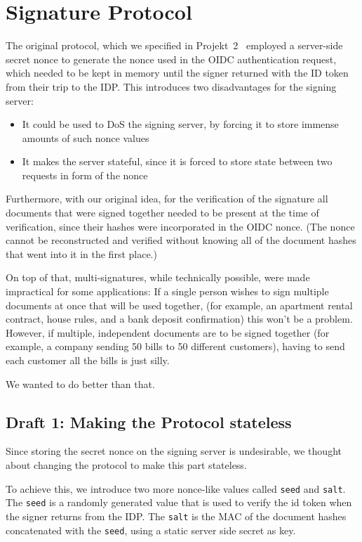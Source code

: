 \section{Signature Protocol}\label{sec:flaws-of-the-original-protocol}
The original protocol,
which we specified in Projekt~2~\cite{projekt2} employed a server-side secret nonce to generate the nonce used in the \gls{OIDC} authentication request,
which needed to be kept in memory until the signer returned with the ID token from their trip to the \gls{IDP}.
This introduces two disadvantages for the signing server:
\begin{itemize}
    \item It could be used to \gls{DoS} the signing server, by forcing it to store immense amounts of such nonce values
    \item It makes the server stateful, since it is forced to store state between two requests in form of the nonce
\end{itemize}


Furthermore, with our original idea,
for the verification of the signature all documents that were signed together needed to be present at the time of verification,
since their hashes were incorporated in the \gls{OIDC} nonce.
(The nonce cannot be reconstructed and verified without knowing all of the document hashes that went into it in the first place.)

On top of that, multi-signatures, while technically possible, were made impractical for some applications:
If a single person wishes to sign multiple documents at once that will be used together,
(for example, an apartment rental contract, house rules, and a bank deposit confirmation)
this won't be a problem.
However, if multiple, independent documents are to be signed together
(for example, a company sending 50 bills to 50 different customers),
having to send each customer all the bills is just silly.


We wanted to do better than that.

\subsection{Draft 1: Making the Protocol stateless}\label{subsec:draft-1:-making-the-protocol-stateless}
Since storing the secret nonce on the signing server is undesirable,
we thought about changing the protocol to make this part stateless.

To achieve this, we introduce two more nonce-like values called \texttt{seed} and \texttt{salt}.
The \texttt{seed} is a randomly generated value that is used to verify the id token when the signer returns from the \gls{IDP}.
The \texttt{salt} is the \gls{MAC} of the document hashes concatenated with the \texttt{seed}, using a static server side secret as key.


